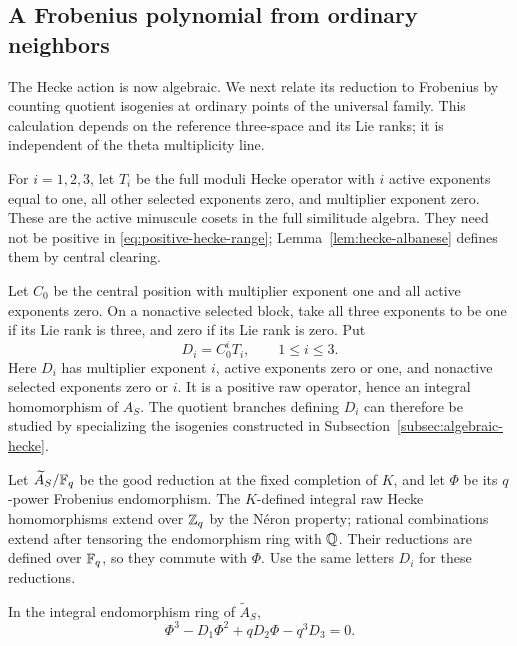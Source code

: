 \subsection{A Frobenius polynomial from ordinary neighbors}\label{subsec:frobenius-neighbors}

The Hecke action is now algebraic.  We next relate its reduction to
Frobenius by counting quotient isogenies at ordinary points of the
universal family.  This calculation depends on the reference
three-space and its Lie ranks; it is independent of the theta
multiplicity line.

For \(i=1,2,3\), let \(T_i\) be the full moduli Hecke operator with
\(i\) active exponents equal to one, all other selected exponents
zero, and multiplier exponent zero.  These are the active minuscule
cosets in the full similitude algebra.  They need not be positive in
\eqref{eq:positive-hecke-range}; Lemma~\ref{lem:hecke-albanese}
defines them by central clearing.

Let \(C_0\) be the central position with multiplier exponent one
and all active exponents zero.  On a nonactive selected block,
take all three exponents to be one if its Lie rank is three, and
zero if its Lie rank is zero.  Put
\begin{equation}\label{eq:integral-D-operators}
D_i=C_0^iT_i,\qquad 1\leq i\leq3.
\end{equation}
Here \(D_i\) has multiplier exponent \(i\), active exponents zero
or one, and nonactive selected exponents zero or \(i\).
It is a positive raw operator, hence an integral homomorphism of
\(A_S\).  The quotient branches defining \(D_i\) can therefore be
studied by specializing the isogenies constructed in
Subsection~\ref{subsec:algebraic-hecke}.

Let \(\widetilde A_S/\mathbb{F}_q\) be the good reduction at the fixed
completion of \(K\), and let \(\Phi\) be its \(q\)-power Frobenius
endomorphism.  The \(K\)-defined integral raw Hecke homomorphisms
extend over \(\mathbb{Z}_q\) by the Néron property; rational combinations
extend after tensoring the endomorphism ring with \(\mathbb{Q}\).
Their reductions are defined
over \(\mathbb{F}_q\), so they commute with \(\Phi\).  Use the same
letters \(D_i\) for these reductions.

\begin{proposition}\label{prop:albanese-congruence}
In the integral endomorphism ring of \(\widetilde A_S\),
\begin{equation}\label{eq:albanese-frobenius-polynomial}
\Phi^3-D_1\Phi^2+qD_2\Phi-q^3D_3=0.
\end{equation}
\end{proposition}

